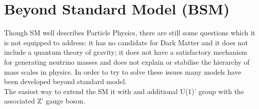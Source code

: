 \section{Beyond Standard Model (BSM)}
Though SM well describes Particle Physics, there are still some questions which it is not equipped to address: \eg it has no candidate for Dark Matter and it does not include a quantum theory of gravity; it does not have a satisfactory mechanism for generating neutrino masses and does not explain or stabilise the hierarchy of mass scales in physics. In order to try to solve these issues many models have been developed beyond standard model.\\
The easiest way to extend the SM it with and additional U(1)' group with the associated Z' gauge boson.

